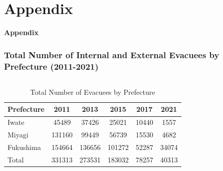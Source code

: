 \documentclass[serif, aspectratio=169]{beamer}
\newcommand{\returnbutton}[2]{%
  \vspace{-1.0cm}  %
  \hfill  %
  \hyperlink{#1}{%
    {\footnotesize\beamerbutton{#2}}%
  }%
  \vspace{0.3cm}  %
}
\begin{document}
\appendix  %

\section{Appendix}
\begin{frame}
    \centering
    \Huge \textbf{Appendix}
\end{frame}

\begin{frame}[label=evacuees_main]
\frametitle{Total Number of Internal and External Evacuees by Prefecture (2011-2021)}





\vspace{-0.38cm} 
\returnbutton{outmigration}{Return}

    \vspace{0.3cm}
    \begin{columns}[T, onlytextwidth]
        \begin{column}{0.5\textwidth}
            \begin{table}[ht]
                \scriptsize
                \setlength{\tabcolsep}{4pt}
                \renewcommand{\arraystretch}{1.0}
                \begin{tabular}{@{}lS[table-format=6.0]S[table-format=6.0]S[table-format=6.0]S[table-format=6.0]S[table-format=6.0]@{}}
                \toprule
                Prefecture & {2011} & {2013} & {2015} & {2017} & {2021} \\
                \midrule
                Iwate & 45489 & 37426 & 25021 & 10440 & 1557 \\
                Miyagi & 131160 & 99449 & 56739 & 15530 & 4682 \\
                Fukushima & 154664 & 136656 & 101272 & 52287 & 34074 \\
                \midrule
                Total & 331313 & 273531 & 183032 & 78257 & 40313 \\
                \bottomrule
                \end{tabular}
                \caption{Total Number of Evacuees by Prefecture}
                \label{tab:evacuees}
            \end{table}
        \end{column}
        

\end{columns}
\end{frame}
\end{document}
